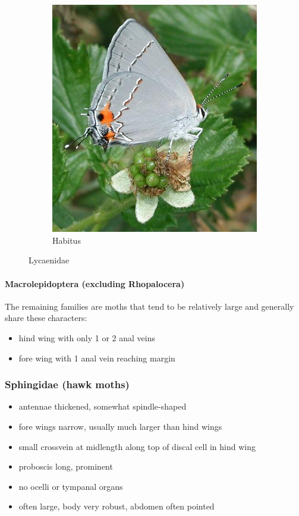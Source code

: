 \documentclass[letterpaper, 11pt]{article}
\begin{document}
\begin{figure}[ht!]
\begin{subfigure}[ht!]{0.4\textwidth}
        \includegraphics[width=\textwidth]{image12}
        \caption{Habitus}
        \label{fig:lycaenid2}
    \end{subfigure}
    \caption{Lycaenidae}\label{fig:lycaenids}
\end{figure}

\paragraph{Macrolepidoptera (excluding Rhopalocera)} The remaining families are moths that tend to be relatively large and generally share these characters: 
\begin{itemize}
\item hind wing with only 1 or 2 anal veins
\item fore wing with 1 anal vein reaching margin
\end{itemize}

\subsubsection{Sphingidae (hawk moths)}
\begin{itemize}
\item antennae thickened, somewhat spindle-shaped
\item fore wings narrow, usually much larger than hind wings
\item small crossvein at midlength along top of discal cell in hind wing
\item proboscis long, prominent
\item no ocelli or tympanal organs
\item often large, body very robust, abdomen often pointed
\end{itemize}
\end{document}
